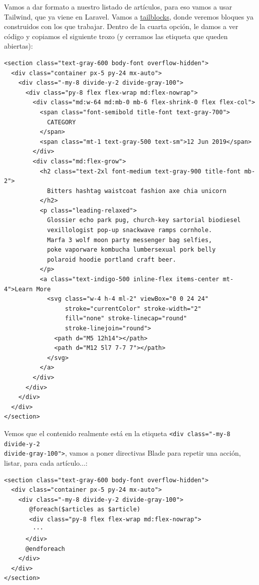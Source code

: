 \documentclass[11pt]{article}
\begin{document}
Vamos a dar formato a nuestro listado de artículos, para eso vamos a
usar Tailwind, que ya viene en Laravel. Vamos a \href{https://tailblocks.cc}{tailblocks}, donde
veremos bloques ya construidos con los que trabajar. Dentro de la
cuarta opción, le damos a ver código y copiamos el siguiente trozo (y
cerramos las etiqueta que queden abiertas):
\begin{verbatim}
<section class="text-gray-600 body-font overflow-hidden">
  <div class="container px-5 py-24 mx-auto">
    <div class="-my-8 divide-y-2 divide-gray-100">
      <div class="py-8 flex flex-wrap md:flex-nowrap">
        <div class="md:w-64 md:mb-0 mb-6 flex-shrink-0 flex flex-col">
          <span class="font-semibold title-font text-gray-700">
            CATEGORY
          </span>
          <span class="mt-1 text-gray-500 text-sm">12 Jun 2019</span>
        </div>
        <div class="md:flex-grow">
          <h2 class="text-2xl font-medium text-gray-900 title-font mb-2">
            Bitters hashtag waistcoat fashion axe chia unicorn
          </h2>
          <p class="leading-relaxed">
            Glossier echo park pug, church-key sartorial biodiesel
            vexillologist pop-up snackwave ramps cornhole.
            Marfa 3 wolf moon party messenger bag selfies,
            poke vaporware kombucha lumbersexual pork belly
            polaroid hoodie portland craft beer.
          </p>
          <a class="text-indigo-500 inline-flex items-center mt-4">Learn More
            <svg class="w-4 h-4 ml-2" viewBox="0 0 24 24"
                 stroke="currentColor" stroke-width="2"
                 fill="none" stroke-linecap="round"
                 stroke-linejoin="round">
              <path d="M5 12h14"></path>
              <path d="M12 5l7 7-7 7"></path>
            </svg>
          </a>
        </div>
      </div>
    </div>
  </div>
</section>
\end{verbatim}

Vemos que el contenido realmente está en la etiqueta \texttt{<div class="-my-8 divide-y-2} \\[0pt]
\texttt{divide-gray-100">}, vamos a poner directivas Blade para repetir una
acción, listar, para cada artículo...:
\begin{verbatim}
<section class="text-gray-600 body-font overflow-hidden">
  <div class="container px-5 py-24 mx-auto">
    <div class="-my-8 divide-y-2 divide-gray-100">
       @foreach($articles as $article)
       <div class="py-8 flex flex-wrap md:flex-nowrap">
        ···
      </div>
      @endforeach
    </div>
  </div>
</section>
\end{verbatim}
\end{document}
